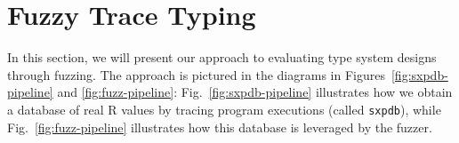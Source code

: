 \documentclass[sigplan,anonymous,review]{acmart}
\begin{document}


\section{Fuzzy Trace Typing}
\label{sec:fuzzy}

In this section, we will present our approach to evaluating type system designs through fuzzing.
The approach is pictured in the diagrams in Figures~\ref{fig:sxpdb-pipeline} and \ref{fig:fuzz-pipeline}:
Fig.~\ref{fig:sxpdb-pipeline} illustrates how we obtain a database of real R values by tracing program executions (called {\tt sxpdb}), while Fig.~\ref{fig:fuzz-pipeline} illustrates how this database is leveraged by the fuzzer.

\end{document}
